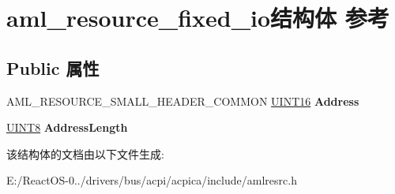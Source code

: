 \hypertarget{structaml__resource__fixed__io}{}\section{aml\+\_\+resource\+\_\+fixed\+\_\+io结构体 参考}
\label{structaml__resource__fixed__io}
\subsection*{Public 属性}
\begin{DoxyCompactItemize}
\item 
\mbox{\label{structaml__resource__fixed__io_a33ecae730646ed370f9b21e0db465d76}} 
A\+M\+L\+\_\+\+R\+E\+S\+O\+U\+R\+C\+E\+\_\+\+S\+M\+A\+L\+L\+\_\+\+H\+E\+A\+D\+E\+R\+\_\+\+C\+O\+M\+M\+ON \hyperlink{_processor_bind_8h_a09f1a1fb2293e33483cc8d44aefb1eb1}{U\+I\+N\+T16} {\bfseries Address}
\item 
\mbox{\label{structaml__resource__fixed__io_ad0bf35d8fa24f6e3f0215ea94ec1a0c1}} 
\hyperlink{_processor_bind_8h_ab27e9918b538ce9d8ca692479b375b6a}{U\+I\+N\+T8} {\bfseries Address\+Length}
\end{DoxyCompactItemize}


该结构体的文档由以下文件生成\+:\begin{DoxyCompactItemize}
\item 
E\+:/\+React\+O\+S-\/0../drivers/bus/acpi/acpica/include/amlresrc.\+h\end{DoxyCompactItemize}
